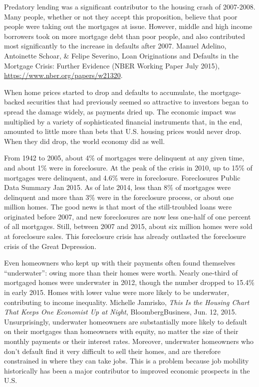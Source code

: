 Predatory lending was a significant contributor to the housing crash of
2007-2008.  Many people, whether or not they accept this proposition, believe
that poor people were taking out the mortgages at issue.  However, middle and
high income borrowers took on more mortgage debt than poor people, and also
contributed most significantly to the increase in defaults after 2007.  Manuel
Adelino, Antoinette Schoar, \& Felipe Severino,
Loan Originations and Defaults in the
Mortgage Crisis: Further Evidence (NBER Working Paper July 2015),
\url{https://www.nber.org/papers/w21320}.  

When home prices started to drop and defaults to accumulate, the mortgage-backed
securities that had previously seemed so attractive to investors began to
spread the damage widely, as payments dried up.  The economic impact was
multiplied by a variety of sophisticated financial instruments that, in the
end, amounted to little more than bets that U.S. housing prices would never
drop.  When they did drop, the world economy did as well.  

From 1942 to 2005, about 4\% of mortgages were delinquent at any given time, and
about 1\% were in foreclosure.  At the peak of the crisis in 2010, up to 15\%
of mortgages were delinquent, and 4.6\% were in foreclosure.  Foreclosures
Public Data Summary Jan 2015.  As of late 2014, less than 8\% of mortgages were
delinquent and more than 3\% were in the foreclosure process, or about one
million homes. The good news is that most of the still-troubled loans were
originated before 2007, and new foreclosures are now less one-half of one
percent of all mortgages. Still, between 2007 and 2015, about six million homes
were sold at foreclosure sales.  This foreclosure crisis has already outlasted
the foreclosure crisis of the Great Depression.  

Even homeowners who kept up with their payments often found themselves
``underwater'': owing more than their homes were worth.  Nearly one-third of
mortgaged homes were underwater in 2012, though the number dropped to 15.4\% in
early 2015.  Homes with lower value were more likely to be underwater,
contributing to income inequality.  Michelle Jamrisko, \textit{This Is the
Housing Chart That Keeps One Economist Up at Night}, BloombergBusiness, Jun.
12, 2015.  Unsurprisingly, underwater homeowners are substantially more likely
to default on their mortgages than homeowners with equity, no matter the size
of their monthly payments or their interest rates.  Moreover, underwater
homeowners who don't default find it very difficult to sell their homes, and
are therefore constrained in where they can take jobs.  This is a problem
because job mobility historically has been a major contributor to improved
economic prospects in the U.S.

